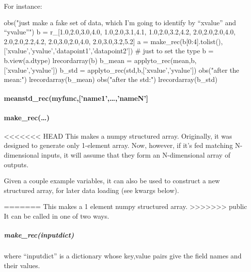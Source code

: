 For instance:

\begin{python}
obs("just make a fake set of data, which I'm going to identify by ``xvalue'' and ``yvalue''")
b = r_[1.0,2.0,3.0,4.0,
    1.0,2.0,3.1,4.1,
    1.0,2.0,3.2,4.2,
    2.0,2.0,2.0,4.0,
    2.0,2.0,2.2,4.2,
    2.0,3.0,2.0,4.0,
    2.0,3.0,3.2,5.2]
a = make_rec(b[0:4].tolist(),['xvalue','yvalue','datapoint1','datapoint2']) # just to set the type
b = b.view(a.dtype)
lrecordarray(b)
b_mean = applyto_rec(mean,b,['xvalue','yvalue'])
b_std = applyto_rec(std,b,['xvalue','yvalue'])
obs("after the mean:")
lrecordarray(b_mean)
obs("after the std:")
lrecordarray(b_std)
\end{python}

\paragraph{meanstd\_rec(myfunc,['name1',\ldots,'nameN']}
\paragraph{make\_rec(\ldots)}
<<<<<<< HEAD
This makes a numpy structured array.
Originally, it was designed to generate only 1-element array.
Now, however, if it's fed matching N-dimensional inputs,
    it will assume that they form an N-dimensional array of outputs.

Given a couple example variables, it can also be used to construct a new structured array, for later data loading (see kwargs below).

=======
This makes a 1 element numpy structured array.
>>>>>>> public
It can be called in one of two ways.

\subparagraph{make\_rec(inputdict)} where ``inputdict'' is a dictionary
    whose key,value pairs give the field names and their values.

